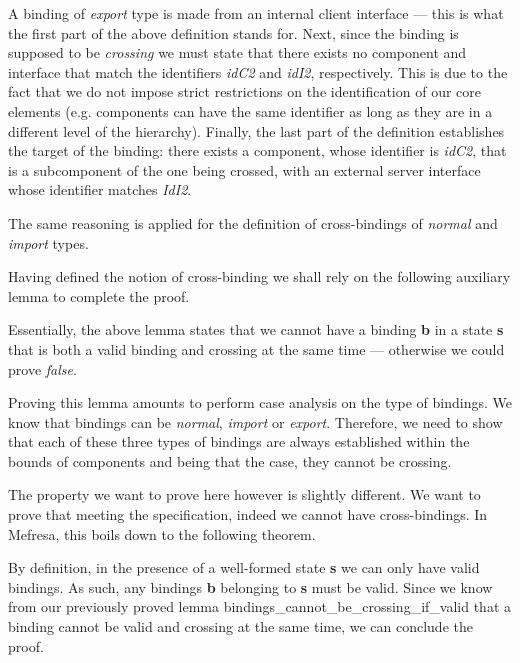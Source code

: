 	

\noindent A binding of \textit{export} type is made from an \textsf{internal client interface} ---
this is what the first part of the above definition stands for. Next, since the \textsf{binding} is supposed
to be \textit{crossing} we must state that there exists no \textsf{component} and \textsf{interface} that match
the identifiers \textit{idC2} and \textit{idI2}, respectively. This is due to the fact that we do not impose
strict restrictions on the identification of our core elements (e.g. \textsf{component}s can have the
same identifier as long as they are in a different level of the hierarchy). Finally, the last part of 
the definition establishes the target of the \textsf{binding}: there exists a 
component, whose identifier is \textit{idC2}, that is a sub\textsf{component} of the one being crossed, with an 
\textsf{external server interface} whose identifier matches \textit{IdI2}.
	
	The same reasoning is applied for the definition of \textsf{cross-bindings} of \textit{normal} and
	\textit{import} types.
	
 	Having defined the notion of cross-binding we shall rely on the following
auxiliary lemma to complete the proof.

	

\noindent
Essentially, the above lemma states that we cannot have a binding \textbf{b} 
in a state \textbf{s} that is both a valid binding and crossing at the same time ---
otherwise we could prove \textit{false}.

Proving this lemma amounts to perform case analysis on the type of bindings.
We know that bindings can be \textit{normal}, \textit{import} or \textit{export}.
Therefore, we need to show that each of these three types of bindings are always
established within the bounds of components and being that the case, they cannot be
crossing. 

The property we want to prove here however is slightly different. We
want to prove that meeting the specification, indeed we cannot have 
cross-bindings. In \textsf{Mefresa}, this boils down to the following theorem.

	

\noindent  By definition, in the presence of a well-formed state \textbf{s} we can only
have valid \textsf{binding}s. As such, any bindings \textbf{b} belonging to \textbf{s} must be valid.
Since we know from our previously proved lemma \textsf{bindings\_cannot\_be\_crossing\_if\_valid}
that a \textsf{binding} cannot be valid and crossing at the same time, we can conclude the proof.


